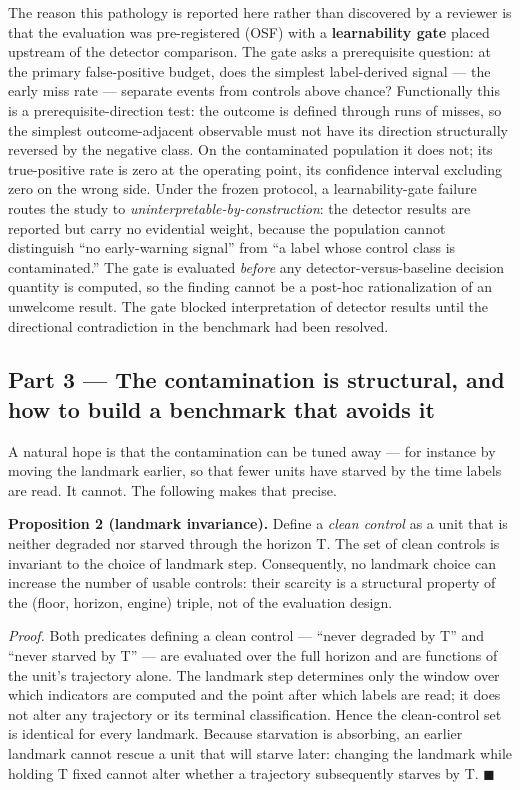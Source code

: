 \documentclass[
  11pt,
]{article}
\begin{document}
The reason this pathology is reported here rather than discovered by a
reviewer is that the evaluation was pre-registered (OSF) with a
\textbf{learnability gate} placed upstream of the detector comparison.
The gate asks a prerequisite question: at the primary false-positive
budget, does the simplest label-derived signal --- the early miss rate
--- separate events from controls above chance? Functionally this is a
prerequisite-direction test: the outcome is defined through runs of
misses, so the simplest outcome-adjacent observable must not have its
direction structurally reversed by the negative class. On the
contaminated population it does not; its true-positive rate is zero at
the operating point, its confidence interval excluding zero on the wrong
side. Under the frozen protocol, a learnability-gate failure routes the
study to \emph{uninterpretable-by-construction}: the detector results
are reported but carry no evidential weight, because the population
cannot distinguish ``no early-warning signal'' from ``a label whose
control class is contaminated.'' The gate is evaluated \emph{before} any
detector-versus-baseline decision quantity is computed, so the finding
cannot be a post-hoc rationalization of an unwelcome result. The gate
blocked interpretation of detector results until the directional
contradiction in the benchmark had been resolved.

\subsection{Part 3 --- The contamination is structural, and how to build
a benchmark that avoids
it}\label{part-3-the-contamination-is-structural-and-how-to-build-a-benchmark-that-avoids-it}

A natural hope is that the contamination can be tuned away --- for
instance by moving the landmark earlier, so that fewer units have
starved by the time labels are read. It cannot. The following makes that
precise.

\textbf{Proposition 2 (landmark invariance).} Define a \emph{clean
control} as a unit that is neither degraded nor starved through the
horizon T. The set of clean controls is invariant to the choice of
landmark step. Consequently, no landmark choice can increase the number
of usable controls: their scarcity is a structural property of the
(floor, horizon, engine) triple, not of the evaluation design.

\emph{Proof.} Both predicates defining a clean control --- ``never
degraded by T'' and ``never starved by T'' --- are evaluated over the
full horizon and are functions of the unit's trajectory alone. The
landmark step determines only the window over which indicators are
computed and the point after which labels are read; it does not alter
any trajectory or its terminal classification. Hence the clean-control
set is identical for every landmark. Because starvation is absorbing, an
earlier landmark cannot rescue a unit that will starve later: changing
the landmark while holding T fixed cannot alter whether a trajectory
subsequently starves by T. \(\blacksquare\)
\end{document}
